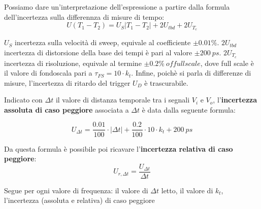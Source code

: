 Possiamo dare un'interpretazione dell'espressione a partire dalla formula dell'incertezza sulla differennza di misure di tempo:
\[U(T_1 - T_2) = U_S |T_1 - T_2| + 2U_{tbd} + 2U_{T_c}\]

$U_S$ incertezza sulla velocità di sweep, equivale al coefficiente $\pm0.01\%$.
$2U_{tbd}$ incertezza di distorsione della base dei tempi è pari al valore $\pm200 \ ps$.
$2U_{T_c}$ incertezza di risoluzione, equivale al termine $\pm0.2\% \ of full scale$, dove full scale è il valore di fondoscala pari a $\tau _{FS}  = 10 \cdot k_t$.
Infine, poichè si parla di differenze di misure, l'incertezza di ritardo del trigger $U_D$ è trascurabile.

Indicato con $\Delta t$ il valore di distanza temporale tra i segnali $V_i$ e $V_o$, l'\textbf{incertezza assoluta di caso peggiore} associata a $\Delta t$ è data dalla seguente formula:

\[U_{\Delta t} = \frac{0.01}{100} \cdot |\Delta t| + \frac{0.2}{100} \cdot  10 \cdot k_t + 200 \ ps  \]

Da questa formula è possibile poi ricavare l'\textbf{incertezza relativa di caso peggiore}:
\[U_{r,\Delta t} = \frac{U_{\Delta t}}{\Delta t}\]

Segue per ogni valore di frequenza: il valore di $\Delta t$ letto, il valore di $k_t$, l'incertezza (assoluta e relativa) di caso peggiore

